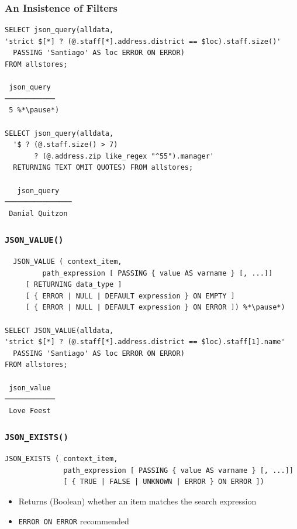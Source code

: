 \begin{frame}[fragile]
  \frametitle{An Insistence of Filters}

  \begin{lstlisting}
SELECT json_query(alldata,
'strict $[*] ? (@.staff[*].address.district == $loc).staff.size()'
  PASSING 'Santiago' AS loc ERROR ON ERROR)
FROM allstores;

 json_query 
────────────
 5 %*\pause*)

SELECT json_query(alldata,
  '$ ? (@.staff.size() > 7)
       ? (@.address.zip like_regex "^55").manager'
  RETURNING TEXT OMIT QUOTES) FROM allstores;

   json_query   
────────────────
 Danial Quitzon
  \end{lstlisting}  
\end{frame}

\begin{frame}[fragile]
  \frametitle{\texttt{JSON\_VALUE()}}

  \begin{lstlisting}
  JSON_VALUE ( context_item,
         path_expression [ PASSING { value AS varname } [, ...]]
	 [ RETURNING data_type ]
	 [ { ERROR | NULL | DEFAULT expression } ON EMPTY ]
	 [ { ERROR | NULL | DEFAULT expression } ON ERROR ]) %*\pause*)

SELECT JSON_VALUE(alldata,
'strict $[*] ? (@.staff[*].address.district == $loc).staff[1].name'
  PASSING 'Santiago' AS loc ERROR ON ERROR)
FROM allstores;

 json_value 
────────────
 Love Feest
  \end{lstlisting}
\end{frame}

\begin{frame}[fragile]
  \frametitle{\texttt{JSON\_EXISTS()}}

  \begin{lstlisting}
JSON_EXISTS ( context_item,
              path_expression [ PASSING { value AS varname } [, ...]]
              [ { TRUE | FALSE | UNKNOWN | ERROR } ON ERROR ])

  \end{lstlisting}

  \begin{itemize}
    \item Returns (Boolean) whether an item matches the search expression
    \item \texttt{ERROR ON ERROR} recommended
  \end{itemize}
\end{frame}


